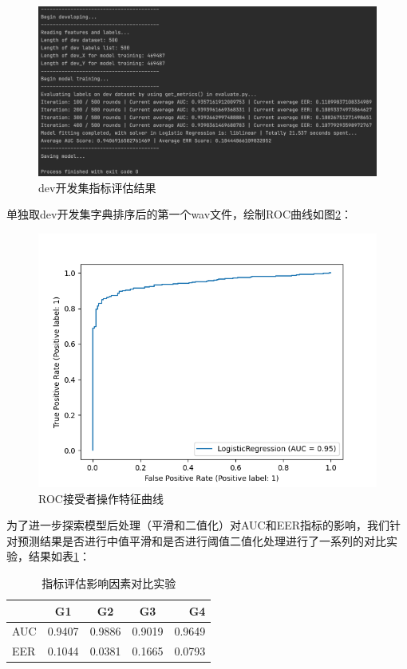 \documentclass[a4paper]{article}
\begin{document}
\begin{figure}[htb]
  \centering
  \includegraphics[scale=0.25]{figs/评估（平滑+二值化.png}
  \caption{dev开发集指标评估结果}
  \label{fig:2}
\end{figure} 

单独取dev开发集字典排序后的第一个wav文件，绘制ROC曲线如图\ref{fig:4}：

\begin{figure}[htb]
  \centering
  \includegraphics[scale=0.5]{figs/roc_curve_1.png}
  \caption{ROC接受者操作特征曲线}
  \label{fig:4}
\end{figure} 

为了进一步探索模型后处理（平滑和二值化）对AUC和EER指标的影响，我们针对预测结果是否进行中值平滑和是否进行阈值二值化处理进行了一系列的对比实验，结果如表\ref{tab:tab1}：

\begin{table}[th]
  \caption{指标评估影响因素对比实验}
  \label{tab:tab1}
  \centering
  \begin{tabular}{ l c c c r }
    \toprule
    \textbf{ } & \textbf{G1} & \textbf{G2} & \textbf{G3} & \textbf{G4} \\
    \midrule
    AUC & 0.9407 & 0.9886 & 0.9019 & 0.9649 \\
    EER & 0.1044 & 0.0381 & 0.1665 & 0.0793 \\
    \bottomrule
  \end{tabular}
\end{table}
\end{document}
